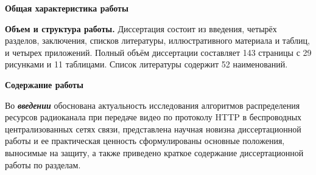 \begin{center}
    \large\bf Общая характеристика работы
\end{center}

\newcommand{\actuality}{{\textbf{Актуальность темы.}}}
\newcommand{\aim}{{\textbf{Целью}}}
\newcommand{\tasks}{{\textbf{задачи}}}
\newcommand{\defpositions}{{\textbf{Основные положения, выносимые на~защиту:}}}
\newcommand{\novelty}{{\textbf{Научная новизна:}}}
\newcommand{\influence}{{\textbf{Теоретическая и практическая значимость}}}
\newcommand{\reliability}{{\textbf{Степень достоверности}}}
\newcommand{\probation}{{\textbf{Апробация результатов.}}}
\newcommand{\contribution}{{\textbf{Личный вклад.}}}
\newcommand{\publications}{{\textbf{Публикации.}}}

\newtheorem{theorem}{Теорема}
\newtheorem{definition}[theorem]{Определение}
\newtheorem{assumption}[theorem]{Допущение}
\newtheorem{assumptionext}[theorem]{Допущение}
\newtheorem{lemma}[theorem]{Утверждение}




{\textbf{Объем и структура работы.}} Диссертация состоит из введения, четырёх разделов, заключения, списков литературы, иллюстративного материала и таблиц, и четырех приложений. Полный объём диссертации составляет 143 страницы с 29 рисунками и 11 таблицами. Список литературы содержит 52 наименований.

\begin{center}
    \large\bf Содержание работы
\end{center}
Во \textbf{\textit{введении}} обоснована актуальность исследования алгоритмов распределения ресурсов радиоканала при передаче видео по протоколу HTTP в беспроводных централизованных сетях связи, представлена научная новизна диссертационной работы и ее практическая ценность сформулированы основные положения, выносимые на защиту, а также приведено краткое содержание диссертационной работы по разделам.


